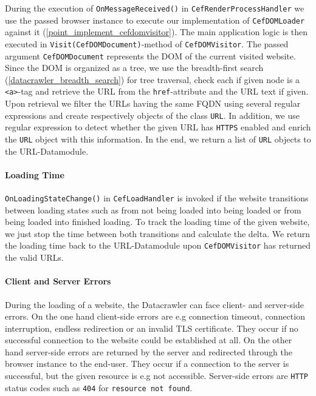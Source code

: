 During the execution of \texttt{OnMessageReceived()} in \texttt{CefRenderProcessHandler} we use the passed browser instance to execute our implementation of \texttt{CefDOMLoader} against it (\ref{point_implement_cefdomvisitor}). The main application logic is then executed in \texttt{Visit(CefDOMDocument)}-method of \texttt{CefDOMVisitor}. The passed argument \texttt{CefDOMDocument} represents the DOM of the current visited website. Since the DOM is organized as a tree, we use the breadth-first search (\ref{datacrawler_breadth_search}) for tree traversal, check each if given node is a \texttt{<a>}-tag and retrieve the URL from the \texttt{href}-attribute and the URL text if given. Upon retrieval we filter the URLs having the same FQDN using several regular expressions and create respectively objects of the class \texttt{URL}. In addition, we use regular expression to detect whether the given URL has \texttt{HTTPS} enabled and enrich the \texttt{URL} object with this information. In the end, we return a list of \texttt{URL} objects to the URL-Datamodule.

\paragraph{Loading Time}
\texttt{OnLoadingStateChange()} in \texttt{CefLoadHandler} is invoked if the website transitions between loading states such as from not being loaded into being loaded or from being loaded into finished loading. To track the loading time of the given website, we just stop the time between both transitions and calculate the delta. We return the loading time back to the URL-Datamodule upon \texttt{CefDOMVisitor} has returned the valid URLs.

\paragraph{Client and Server Errors}
During the loading of a website, the Datacrawler can face client- and server-side errors. On the one hand client-side errors are e.g connection timeout, connection interruption, endless redirection or an invalid TLS certificate. They occur if no successful connection to the website could be established at all. On the other hand server-side errors are returned by the server and redirected through the browser instance to the end-user. They occur if a connection to the server is successful, but the given resource is e.g not accessible. Server-side errors are \texttt{HTTP} status codes such as \texttt{404} for \texttt{resource not found}. 

